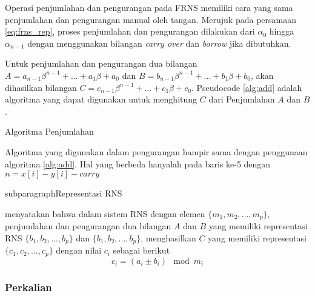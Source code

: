     Operasi penjumlahan dan pengurangan pada FRNS memiliki cara yang sama penjumlahan dan pengurangan manual oleh tangan. Merujuk pada persamaan \ref{eq:frns_rep}, proses penjumlahan dan pengurangan dilakukan dari $\alpha_0$ hingga $\alpha_{n-1}$ dengan menggunakan bilangan \textit{carry over} dan \textit{borrow} jika dibutuhkan.

    Untuk penjumlahan dan pengurangan dua bilangan $A = a_{n-1}\beta^{n-1}+...+a_{1}\beta+a_{0}$ dan $B = b_{n-1}\beta^{n-1}+...+b_{1}\beta+b_{0}$, akan dihasilkan bilangan $C = c_{n-1}\beta^{n-1}+...+c_{1}\beta+c_{0}$. Pseudocode \ref{alg:add} adalah algoritma yang dapat digunakan untuk menghitung $C$ dari Penjumlahan $A$ dan $B$.

    \begin{algorithm}
      \caption{Algoritma Penjumlahan}
        \label{alg:add}
      \begin{algorithmic}[1]
        \Statex
          \EndFor
          \State {}
        \EndFunction
      \end{algorithmic}
    \end{algorithm}

    Algoritma yang digunakan dalam pengurangan hampir sama dengan penggunaan algoritma \ref{alg:add}. Hal yang berbeda hanyalah pada baris ke-5 dengan $n = x[i] - y[i] - carry $

    subparagraph{Representasi RNS}

    \citet{rns_sharoun} menyatakan bahwa dalam sistem RNS dengan elemen $\{m_1,m_2,...,m_p\}$, penjumlahan dan pengurangan dua bilangan $A$ dan $B$ yang memiliki representasi RNS $\{b_1,b_2,...,b_p\}$ dan $\{b_1,b_2,...,b_p\}$,  menghasilkan $C$ yang memiliki representasi $\{c_1,c_2,...,c_p\}$ dengan nilai $c_i$ sebagai berikut
    \begin{equation}
        c_i = (a_i \pm b_i) \mod m_i
    \end{equation}



    \subsubsection{Perkalian} \label{sec:mul_theory}


